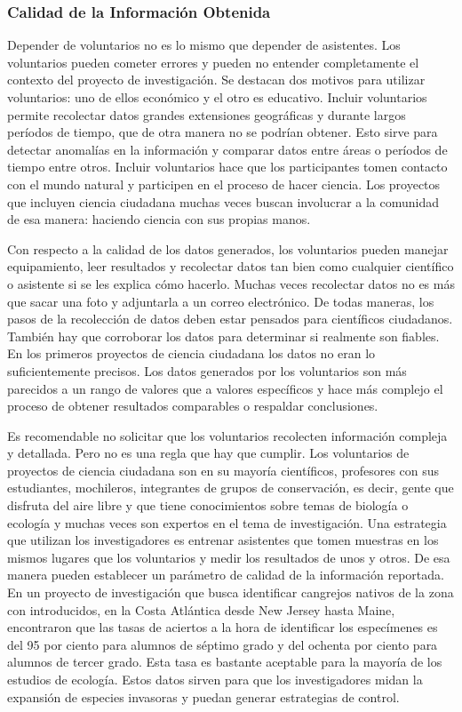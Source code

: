 \subsubsection{Calidad de la Información Obtenida}	

Depender de voluntarios no es lo mismo que depender de asistentes. Los voluntarios pueden cometer errores y pueden no entender completamente el contexto del proyecto de investigación. Se destacan dos motivos para utilizar voluntarios: uno de ellos económico y el otro es educativo. Incluir voluntarios permite recolectar datos grandes extensiones geográficas y durante largos períodos de tiempo, que de otra manera no se podrían obtener. Esto sirve para detectar anomalías en la información y comparar datos entre áreas o períodos de tiempo entre otros. Incluir voluntarios hace que los participantes tomen contacto con el mundo natural y participen en el proceso de hacer ciencia. Los proyectos que incluyen ciencia ciudadana muchas veces buscan involucrar a la comunidad de esa manera: haciendo ciencia con sus propias manos.

Con respecto a la calidad de los datos generados, los voluntarios pueden manejar equipamiento, leer resultados y recolectar datos tan bien como cualquier científico o asistente si se les explica cómo hacerlo. Muchas veces recolectar datos no es más que sacar una foto y adjuntarla a un correo electrónico. De todas maneras, los pasos de la recolección de datos deben estar pensados para científicos ciudadanos. También hay que corroborar los datos para determinar si realmente son fiables. En los primeros proyectos de ciencia ciudadana los datos no eran lo suficientemente precisos. Los datos generados por los voluntarios son más parecidos a un rango de valores que a valores específicos y hace más complejo el proceso de obtener resultados comparables o respaldar conclusiones. 

Es recomendable no solicitar que los voluntarios recolecten información compleja y detallada. Pero no es una regla que hay que cumplir. Los voluntarios de proyectos de ciencia ciudadana son en su mayoría científicos, profesores con sus estudiantes, mochileros, integrantes de grupos de conservación, es decir, gente que disfruta del aire libre y que tiene conocimientos sobre temas de biología o ecología y muchas veces son expertos en el tema de investigación. Una estrategia que utilizan los investigadores es entrenar asistentes que tomen muestras en los mismos lugares que los voluntarios y medir los resultados de unos y otros. De esa manera pueden establecer un parámetro de calidad de la información reportada. En un proyecto de investigación que busca identificar cangrejos nativos de la zona con introducidos, en la Costa Atlántica desde New Jersey hasta Maine, encontraron que las tasas de aciertos a la hora de identificar los especímenes es del 95 por ciento para alumnos de séptimo grado y del ochenta por ciento para alumnos de tercer grado. Esta tasa es bastante aceptable para la mayoría de los estudios de ecología. Estos datos sirven para que los investigadores midan la expansión de especies invasoras y puedan generar estrategias de control. \cite{cohn2008citizen}
	

